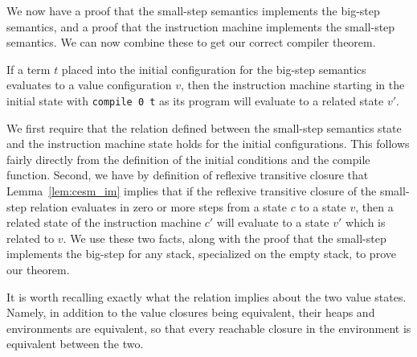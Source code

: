 We now have a proof that the small-step semantics implements the big-step
semantics, and a proof that the instruction machine implements the small-step
semantics. We can now combine these to get our correct compiler theorem. 

\begin{theorem} 
\label{thm:correctness}
If a term $t$ placed into the initial configuration for the big-step semantics
evaluates to a value configuration $v$, then the instruction machine starting
in the initial state with \texttt{compile 0 t} as its program will evaluate to a
related state $v'$.  
\end{theorem}
\begin{proofoutline}
We first require that the relation defined between the small-step semantics
state and the instruction machine state holds for the initial configurations.
This follows fairly directly from the definition of the initial conditions and
the compile function. Second, we have by definition of reflexive transitive
closure that Lemma~\ref{lem:cesm_im} implies that if the reflexive transitive
closure of the small-step relation evaluates in zero or more steps from a
state $c$ to a state $v$, then a related state of the instruction machine $c'$
will evaluate to a state $v'$ which is related to $v$. We use these two facts,
along with the proof that the small-step implements the big-step for any stack,
specialized on the empty stack, to prove our theorem. 
\end{proofoutline}

It is worth recalling exactly what the relation implies about the two value
states. Namely, in addition to the value closures being equivalent, their heaps
and environments are equivalent, so that every reachable closure in the
environment is equivalent between the two.


